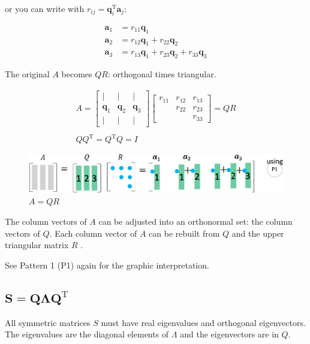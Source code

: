 \documentclass[letterpaper]{article}
\DeclareRobustCommand\transp{^{\mathrm{T}}}
\begin{document}
or you can write with $r_{ij} = \bm{q}_i\transp \bm{a}_j$:

\begin{align*}
  \bm{a}_1 &= r_{11}\bm{q}_1\\
  \bm{a}_2 &= r_{12}\bm{q}_1 + r_{22} \bm{q}_2\\
  \bm{a}_3 &= r_{13}\bm{q}_1 + r_{23} \bm{q}_2 + r_{33} \bm{q}_3
\end{align*}

The original $A$ becomes $QR$: orthogonal times triangular.

\begin{gather*}
  A = 
  \begin{bmatrix}
    | & | & |\\
    \bm{q}_1 & \bm{q}_2 & \bm{q}_3\\
    | & | & |
  \end{bmatrix}
  \begin{bmatrix}
    r_{11} & r_{12} & r_{13}\\
           & r_{22} & r_{23}\\
           &        & r_{33}
  \end{bmatrix} = QR\\
  \\
  Q Q\transp=Q\transp Q = I
\end{gather*}

\begin{figure}[H]
  \centering
  \includegraphics[scale=0.8]{QR.eps}
  \caption{$A=QR$}
\end{figure}

The column vectors of $A$ can be adjusted into an orthonormal set: the column vectors of $Q$.
Each column vector of $A$ can be rebuilt from $Q$ and the upper triangular matrix $R$ .

See Pattern 1 (P1) again for the graphic interpretation.


\subsection{$\boldsymbol{S=Q \Lambda Q\transp}$}

All symmetric matrices $S$ must have real eigenvalues and orthogonal eigenvectors.
The eigenvalues are the diagonal elements of $\Lambda$ and the eigenvectors are in $Q$. 
\end{document}
